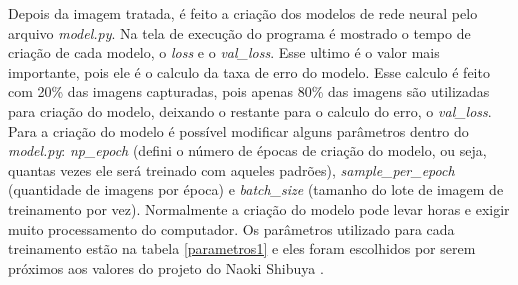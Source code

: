 	\begin{figure}[H]
		\centering
\end{figure}

Depois da imagem tratada, é feito a criação dos modelos de rede neural pelo arquivo \textit{model.py}. Na tela de execução do programa é mostrado o tempo de criação de cada modelo, o \textit{loss} e o \textit{val\_loss}. Esse ultimo é o valor mais importante, pois ele é o calculo da taxa de erro do modelo. Esse calculo é feito com 20\% das imagens capturadas, pois apenas 80\% das imagens são utilizadas para criação do modelo, deixando o restante para o calculo do erro, o \textit{val\_loss}.
Para a criação do modelo é possível modificar alguns parâmetros dentro do \textit{model.py}: \textit{np\_epoch} (defini o número de épocas de criação do modelo, ou seja, quantas vezes ele será treinado com aqueles padrões), \textit{sample\_per\_epoch} (quantidade de imagens por época) e \textit{batch\_size} (tamanho do lote de imagem de treinamento por vez). Normalmente a criação do modelo pode levar horas e exigir muito processamento do computador. Os parâmetros utilizado para cada treinamento estão na tabela \ref{parametros1} e eles foram escolhidos por serem próximos aos valores do projeto do Naoki Shibuya \cite{naokish}.

